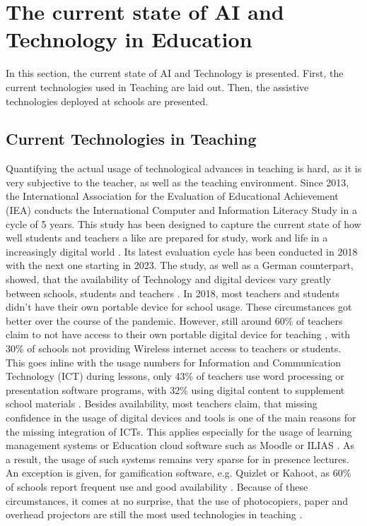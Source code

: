 \documentclass{Academic}
\begin{document}
    \section{The current state of AI and Technology in Education}
    In this section, the current state of AI and Technology is presented. First, the current technologies used in Teaching are laid out. Then, the assistive technologies deployed at schools are presented.

    \subsection{Current Technologies in Teaching}
    Quantifying the actual usage of technological advances in teaching is hard, as it is very subjective to the teacher, as well as the teaching environment. Since 2013, the International Association for the Evaluation of Educational Achievement (IEA) conducts the International Computer and Information Literacy Study in a cycle of 5 years. This study has been designed to capture the current state of how well students and teachers a like are prepared for study, work and life in a increasingly digital world \cite{noauthor_icils_nodate}. Its latest evaluation cycle has been conducted in 2018 with the next one starting in 2023. The study, as well as a German counterpart, showed, that the availability of Technology and digital devices vary greatly between schools, students and teachers \cite{musmann_digitalisierung_2021}. In 2018, most teachers and students didn't have their own portable device for school usage. These circumstances got better over the course of the pandemic. However, still around 60\% of teachers claim to not have access to their own portable digital device for teaching \cite{musmann_digitalisierung_2021}, with 30\% of schools not providing Wireless internet access to teachers or students. This goes inline with the usage numbers for Information and Communication Technology (ICT) during lessons, only 43\% of teachers use word processing or presentation software programs, with 32\% using digital content to supplement school materials \cite{noauthor_icils_nodate}. Besides availability, most teachers claim, that missing confidence in the usage of digital devices and tools is one of the main reasons for the missing integration of ICTs. This applies especially for the usage of learning management systems or Education cloud software such as Moodle or ILIAS \cite{noauthor_icils_nodate}. As a result, the usage of such systems remains very sparse for in presence lectures. An exception is given, for gamification software, e.g. Quizlet or Kahoot, as 60\% of schools report frequent use and good availability \cite{noauthor_icils_nodate}. Because of these circumstances, it comes at no surprise, that the use of photocopiers, paper and overhead projectors are still the most used technologies in teaching \cite{noauthor_202122_nodate}.
\end{document}

